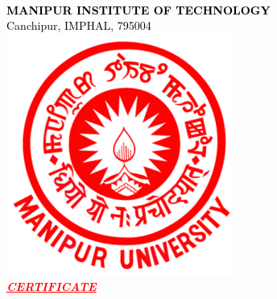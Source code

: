 \documentclass[12pt, oneside, a4paper]{book}
\begin{document}
\newpage
{}
\begingroup
    \begin{center}
        \textcolor{black}
        {
        \color{red}\large {}\\
        \normalsize \textbf{MANIPUR INSTITUTE OF TECHNOLOGY}\\
        \normalsize Canchipur, IMPHAL, 795004\\[1em]
        \includegraphics[scale=0.4]{graphics/MU Logo.png}\\[0.5em]
        }
        \textcolor{red}
        {
        \large \textit{\underline{\textbf{CERTIFICATE}}}
        }
    \end{center}
\endgroup
\end{document}
